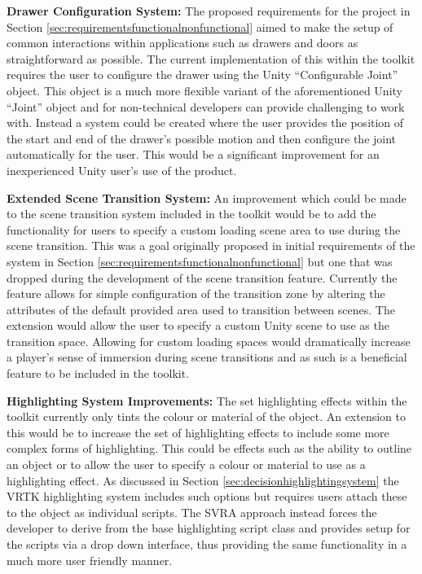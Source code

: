 \documentclass{l4proj}
\begin{document}
\textbf{Drawer Configuration System:} The proposed requirements for the project in Section \ref{sec:requirementsfunctionalnonfunctional} aimed to make the setup of common interactions within applications such as drawers and doors as straightforward as possible. The current implementation of this within the toolkit requires the user to configure the drawer using the Unity ``Configurable Joint'' object. This object is a much more flexible variant of the aforementioned Unity ``Joint'' object and for non-technical developers can provide challenging to work with. Instead a system could be created where the user provides the position of the start and end of the drawer's possible motion and then configure the joint automatically for the user. This would be a significant improvement for an inexperienced Unity user's use of the product. 

\textbf{Extended Scene Transition System:} An improvement which could be made to the scene transition system included in the toolkit would be to add the functionality for users to specify a custom loading scene area to use during the scene transition. This was a goal originally proposed in initial requirements of the system in Section \ref{sec:requirementsfunctionalnonfunctional} but one that was dropped during the development of the scene transition feature. Currently the feature allows for simple configuration of the transition zone by altering the attributes of the default provided area used to transition between scenes. The extension would allow the user to specify a custom Unity scene to use as the transition space. Allowing for custom loading spaces would dramatically increase a player's sense of immersion during scene transitions and as such is a beneficial feature to be included in the toolkit.

\textbf{Highlighting System Improvements:} The set highlighting effects within the toolkit currently only tints the colour or material of the object. An extension to this would be to increase the set of highlighting effects to include some more complex forms of highlighting. This could be effects such as the ability to outline an object or to allow the user to specify a colour or material to use as a highlighting effect. As discussed in Section \ref{sec:decisionhighlightingsystem} the VRTK highlighting system includes such options but requires users attach these to the object as individual scripts. The SVRA approach instead forces the developer to derive from the base highlighting script class and provides setup for the scripts via a drop down interface, thus providing the same functionality in a much more user friendly manner. 
\end{document}
